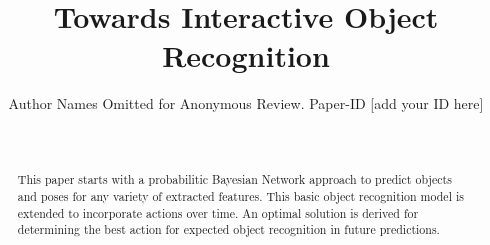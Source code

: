 \documentclass[conference]{IEEEtran}
\begin{document}
    \title{Towards Interactive Object Recognition}

    \author{Author Names Omitted for Anonymous Review. Paper-ID [add your ID here]}





    \author{\\
    }

    \maketitle

\begin{abstract}
    This paper starts with a probabilitic Bayesian Network approach to predict objects and poses for any variety of extracted features. This basic object recognition model is extended to incorporate actions over time. An optimal solution is derived for determining the best action for expected object recognition in future predictions.   
\end{abstract}
\end{document}
